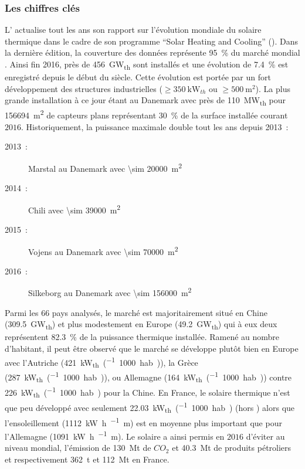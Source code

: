 \subsubsection{Les chiffres clés} %
\label{ssub:les_chiffres_cles}
L’ actualise tout les ans son rapport sur l’évolution mondiale du solaire thermique
dans le cadre de son programme \enquote{Solar Heating and Cooling} (). Dans la dernière
édition, la couverture des données représente \SI{95}{\percent} du
marché mondial \parencite{Weiss2017}. Ainsi fin 2016, près de \SI{456}{\giga\watt_{th}}
sont installés et une évolution de \SI{7.4}{\percent} est enregistré depuis le début du
siècle. Cette évolution est portée par un fort développement des structures industrielles
($\geq \SI{350}{\kilo\watt_{th}}$ ou $\geq \SI{500}{\metre\squared}$). La plus grande
installation à ce jour étant au Danemark avec près de \SI{110}{\mega\watt_{th}} pour
\SI{156694}{\metre\squared} de capteurs plans représentant \SI{30}{\percent} de la surface
installée courant $2016$. Historiquement, la puissance maximale double tout les ans depuis
2013~:
\begin{description}
    \item[2013~:] Marstal au Danemark avec \SI{\sim 20000}{\metre\squared}
    \item[2014~:] Chili avec \SI{\sim 39000}{\metre\squared}
    \item[2015~:] Vojens au Danemark avec \SI{\sim 70000}{\metre\squared}
    \item[2016~:] Silkeborg  au Danemark avec \SI{\sim 156000}{\metre\squared}
\end{description}
Parmi les $66$ pays analysés, le marché est majoritairement situé en Chine
(\SI{309.5}{\giga\watt_{th}}) et plus modestement en Europe (\SI{49.2}{\giga\watt_{th}})
qui à eux deux représentent \SI{82.3}{\percent} de la puissance thermique installée.
Ramené au nombre d’habitant, il peut être observé que le marché se développe plutôt bien
en Europe avec l’Autriche (\SI{421}{\kilo\watt_{th}\per(1000 hab.)}), la Grèce
(\SI{287}{\kilo\watt_{th}\per(1000 hab.)}), ou Allemagne
(\SI{164}{\kilo\watt_{th}\per(1000 hab.)}) contre \SI{226}{\kilo\watt_{th}\per(1000 hab.)}
pour la Chine. En France, le solaire thermique n’est que peu développé avec seulement
\SI{22.03}{\kilo\watt_{th}\per(1000 hab.)} (hors ) alors que l’ensoleillement
(\SI{1112}{\kilo\watt\hour\per\squared\metre}) est en moyenne plus important que
pour l’Allemagne (\SI{1091}{\kilo\watt\hour\per\squared\metre}).
Le solaire a ainsi permis en $2016$ d’éviter au niveau mondial, l’émission de
\SI{130}{\mega\tonne} de $CO_{2}$ et \SI{40.3}{\mega\tonne} de produits pétroliers et
respectivement \SI{362}{\tonne} et \SI{112}{\mega\tonne} en France.

